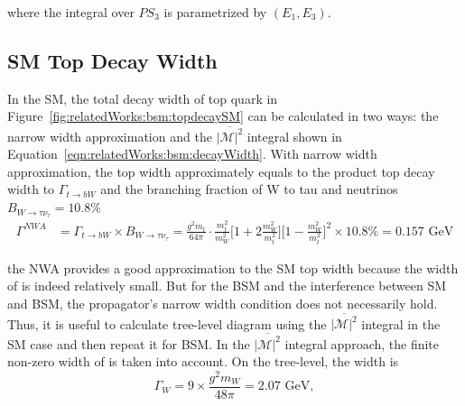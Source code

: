 \noindent where the integral over $PS_3$ is parametrized by $ ( E_1,E_3 )$.



\subsection{SM Top Decay Width}
\label{sec:relatedWorks:bsm:smTopDecay}

In the SM, the total decay width of top quark in Figure~\ref{fig:relatedWorks:bsm:topdecaySM} can be calculated in two ways: the narrow width approximation and the $\overline{ |\mathcal{M}|^2 } $ integral shown in Equation~\ref{eqn:relatedWorks:bsm:decayWidth}. With narrow width approximation, the top width approximately equals to the product top decay width to \PW $\Gamma_{t\to b W}$ and the branching fraction of W to tau and neutrinos $B_{W\to \tau \nu_\tau} = 10.8\%$
\begin{equation}
\begin{split}
    \Gamma^{NWA} &= \Gamma_{t\to b W} \times B_{W\to \tau \nu_\tau} = \frac{g^2 m_t }{64\pi} \cdot \frac{m_t^2}{m_W^2} \bigg[ 1+2 \frac{m_W^2}{m_t^2}\bigg] \bigg[1-\frac{m_W^2}{m_t^2} \bigg]^2 \times 10.8\%  = 0.157 \text{ GeV}
\end{split}
\label{eqn:relatedWorks:bsm:nwa}
\end{equation}

\noindent the NWA provides a good approximation to the SM top width because the width of \PW is indeed relatively small. But for the BSM and the interference between SM and BSM, the propagator's narrow width condition does not necessarily hold. Thus, it is useful to calculate tree-level diagram using the $\overline{ |\mathcal{M}|^2 } $ integral in the SM case and then repeat it for BSM. In the $\overline{ |\mathcal{M}|^2 } $ integral approach, the finite non-zero width of \PW is taken into account. On the tree-level, the \PW width is
\begin{equation}
	\Gamma_W = 9 \times \frac{g^2 m_W}{48 \pi} = 2.07 \text{ GeV},
    \label{eqn:relatedWorks:bsm:wWidth}
\end{equation}

